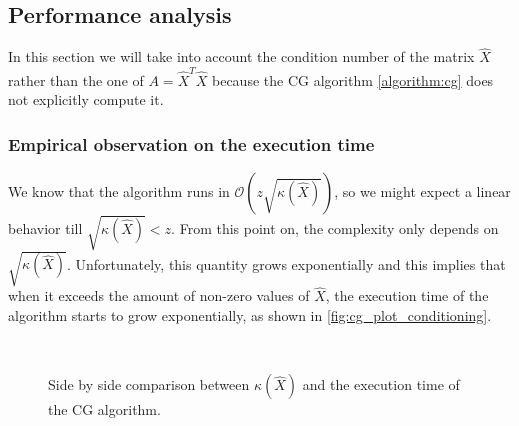 \subsection{Performance analysis} \label{subsec:cg_performance}

In this section we will take into account the condition number of the matrix $\hat{X}$ rather than the one of $A = \hat{X}^T \hat{X}$ because the CG algorithm \eqref{algorithm:cg} does not explicitly compute it.

\subsubsection{Empirical observation on the execution time}
We know that the algorithm runs in $\mathcal{O}(z\sqrt{\kappa(\hat{X})})$, so we might expect a linear behavior till $\sqrt{\kappa(\hat{X})} < z$. From this point on, the complexity only depends on $\sqrt{\kappa(\hat{X})}$. Unfortunately, this quantity grows exponentially and this implies that when it exceeds the amount of non-zero values of $\hat{X}$, the execution time of the algorithm starts to grow exponentially, as shown in \autoref{fig:cg_plot_conditioning}.

\begin{figure}[H]
    \centering
     \\
    \caption{Side by side comparison between $\kappa(\hat{X})$ and the execution time of the CG algorithm.}
    \label{fig:cg_plot_conditioning}
\end{figure}

